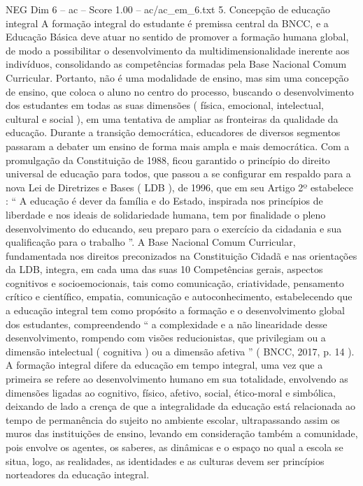\begin{textsample}{NEG Dim 6 – ac – Score 1.00 – ac/ac\_em\_6.txt}  \label{ex:f6_neg_135}
5.
Concepção de educação integral A formação integral do estudante é premissa central da BNCC, e a Educação Básica deve atuar no sentido de promover a formação humana global, de modo a possibilitar o desenvolvimento da multidimensionalidade inerente aos indivíduos, consolidando as competências formadas pela Base Nacional Comum Curricular.
Portanto, não é uma modalidade de ensino, mas sim uma concepção de ensino, que coloca o aluno no centro do processo, buscando o desenvolvimento dos estudantes em todas as suas dimensões ( física, emocional, intelectual, cultural e social ), em uma tentativa de ampliar as fronteiras da qualidade da educação.
Durante a transição democrática, educadores de diversos segmentos passaram a debater um ensino de forma mais ampla e mais democrática.
Com a promulgação da Constituição de 1988, ficou garantido o princípio do direito universal de educação para todos, que passou a se configurar em respaldo para a nova Lei de Diretrizes e Bases ( LDB ), de 1996, que em seu Artigo 2º estabelece : “ A educação é dever da família e do Estado, inspirada nos princípios de liberdade e nos ideais de solidariedade humana, tem por finalidade o pleno desenvolvimento do educando, seu preparo para o exercício da cidadania e sua qualificação para o trabalho ”.
A Base Nacional Comum Curricular, fundamentada nos direitos preconizados na Constituição Cidadã e nas orientações da LDB, integra, em cada uma das suas 10 Competências gerais, aspectos cognitivos e socioemocionais, tais como comunicação, criatividade, pensamento crítico e científico, empatia, comunicação e autoconhecimento, estabelecendo que a educação integral tem como propósito a formação e o desenvolvimento global dos estudantes, compreendendo “ a complexidade e a não linearidade desse desenvolvimento, rompendo com visões reducionistas, que privilegiam ou a dimensão intelectual ( cognitiva ) ou a dimensão afetiva ” ( BNCC, 2017, p. 14 ).
A formação integral difere da educação em tempo integral, uma vez que a primeira se refere ao desenvolvimento humano em sua totalidade, envolvendo as dimensões ligadas ao cognitivo, físico, afetivo, social, ético-moral e simbólica, deixando de lado a crença de que a integralidade da educação está relacionada ao tempo de permanência do sujeito no ambiente escolar, ultrapassando assim os muros das instituições de ensino, levando em consideração também a comunidade, pois envolve os agentes, os saberes, as dinâmicas e o espaço no qual a escola se situa, logo, as realidades, as identidades e as culturas devem ser princípios norteadores da educação integral.

\end{textsample}
